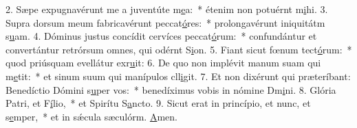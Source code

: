 2. Sæpe expugnavérunt me a juventúte m\uline{e}a:~* étenim non potuérnt m\uline{i}hi.
3. Supra dorsum meum fabricavérunt peccat\uline{ó}res:~* prolongavérunt iniquitátm s\uline{u}am.
4. Dóminus justus concídit cervíces peccat\uline{ó}rum:~* confundántur et convertántur retrórsum omnes, qui odérnt S\uline{i}on.
5. Fiant sicut fœnum tect\uline{ó}rum:~* quod priúsquam evellátur exr\uline{u}it:
6. De quo non implévit manum suam qui m\uline{e}tit:~* et sinum suum qui manípulos cll\uline{i}git.
7. Et non dixérunt qui præteríbant: Benedíctio Dómini s\uline{u}per vos:~* benedíximus vobis in nómine Dm\uline{i}ni.
8. Glória Patri, et F\uline{í}lio,~* et Spirítu S\uline{a}ncto.
9. Sicut erat in princípio, et nunc, et s\uline{e}mper,~* et in sǽcula sæculórm. \uline{A}men.
